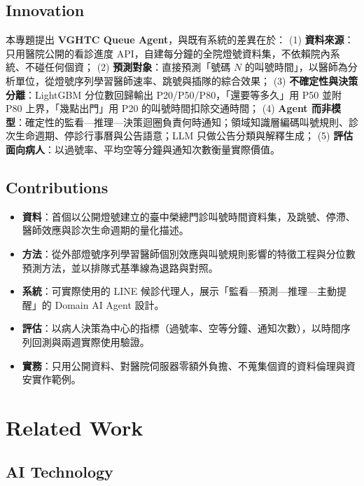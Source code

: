 \documentclass[11pt,twocolumn]{article}
\begin{document}
\subsection{Innovation}
本專題提出 \textbf{VGHTC Queue Agent}，與既有系統的差異在於：
(1) \textbf{資料來源}：只用醫院公開的看診進度 API，自建每分鐘的全院燈號資料集，不依賴院內系統、不碰任何個資；
(2) \textbf{預測對象}：直接預測「號碼 $N$ 的叫號時間」，以醫師為分析單位，從燈號序列學習醫師速率、跳號與插隊的綜合效果；
(3) \textbf{不確定性與決策分離}：LightGBM 分位數回歸輸出 P20/P50/P80，「還要等多久」用 P50 並附 P80 上界，「幾點出門」用 P20 的叫號時間扣除交通時間；
(4) \textbf{Agent 而非模型}：確定性的監看—推理—決策迴圈負責何時通知；領域知識層編碼叫號規則、診次生命週期、停診行事曆與公告語意；LLM 只做公告分類與解釋生成；
(5) \textbf{評估面向病人}：以過號率、平均空等分鐘與通知次數衡量實際價值。

\subsection{Contributions}
\begin{itemize}
\item \textbf{資料}：首個以公開燈號建立的臺中榮總門診叫號時間資料集，及跳號、停滯、醫師效應與診次生命週期的量化描述。
\item \textbf{方法}：從外部燈號序列學習醫師個別效應與叫號規則影響的特徵工程與分位數預測方法，並以排隊式基準線為退路與對照。
\item \textbf{系統}：可實際使用的 LINE 候診代理人，展示「監看—預測—推理—主動提醒」的 Domain AI Agent 設計。
\item \textbf{評估}：以病人決策為中心的指標（過號率、空等分鐘、通知次數），以時間序列回測與兩週實際使用驗證。
\item \textbf{實務}：只用公開資料、對醫院伺服器零額外負擔、不蒐集個資的資料倫理與資安實作範例。
\end{itemize}

\section{Related Work}

\subsection{AI Technology}
\end{document}
